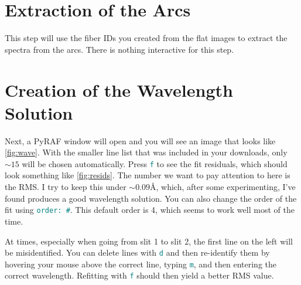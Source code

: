 \documentclass[12pt]{report}
\newcommand{\ty}[1]{\textcolor{teal}{\texttt{#1}}}
\begin{document}
\section{Extraction of the Arcs}

This step will use the fiber IDs you created from the flat images to extract the spectra from the arcs. There is nothing interactive for this step.

\section{Creation of the Wavelength Solution}
\label{waves}

Next, a PyRAF window will open and you will see an image that looks like \autoref{fig:wave}. With the smaller line list that was included in your downloads, only $\sim 15$ will be chosen automatically. Press \ty{f} to see the fit residuals, which should look something like \autoref{fig:resids}. The number we want to pay attention to here is the RMS. I try to keep this under $\sim0.09$\AA, which, after some experimenting, I've found produces a good wavelength solution. You can also change the order of the fit using \ty{order: \#}. This default order is 4, which seems to work well most of the time. 

At times, especially when going from slit 1 to slit 2, the first line on the left will be misidentified. You can delete lines with \ty{d} and then re-identify them by hovering your mouse above the correct line, typing \ty{m}, and then entering the correct wavelength. Refitting with \ty{f} should then yield a better RMS value.
\end{document}

